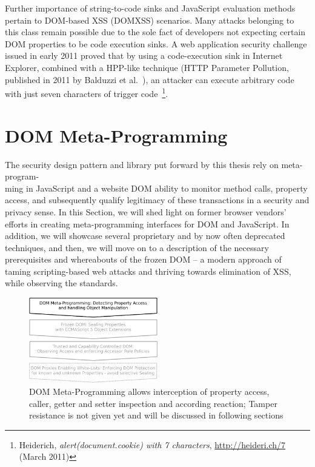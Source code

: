     Further importance of string-to-code sinks and JavaScript evaluation methods pertain to DOM-based XSS (DOMXSS) scenarios. Many attacks belonging to this class remain possible due to the sole fact of developers not expecting certain DOM properties to be code execution sinks. A web application security challenge issued in early 2011 proved that by using a code-execution sink in Internet Explorer, combined with a HPP-like technique (HTTP Parameter Pollution, published in 2011 by Balduzzi et al.~\cite{balduzzi2011automated}), an attacker can execute arbitrary code with just seven characters of trigger code~\footnote{Heiderich, \textit{alert(document.cookie) with 7 characters}, \url{http://heideri.ch/7} (March 2011)}.

  \section{DOM Meta-Programming}
  \label{subsec:6.3.dom_meta_programming}

    The security design pattern and library put forward by this thesis rely on meta-program-\\
ming in JavaScript and a website DOM ability to monitor method calls, property access, and subsequently qualify legitimacy of these transactions in a security and privacy sense. In this Section, we will shed light on former browser vendors' efforts in creating meta-programming interfaces for DOM and JavaScript. In addition, we will showcase several proprietary and by now often deprecated techniques, and then, we will move on to a description of the necessary prerequisites and whereabouts of the frozen DOM -- a modern approach of taming scripting-based web attacks and thriving towards elimination of XSS, while observing the standards.

\begin{figure}[htb]
\centering
\includegraphics[width=0.5\textwidth]{./img/dom-protect-1.pdf}
\caption{DOM Meta-Programming allows interception of property access, caller, getter and setter inspection and according reaction; Tamper resistance is not given yet and will be discussed in following sections}
\label{fig:dom-protect-1}
\end{figure}

